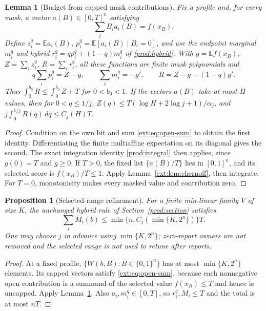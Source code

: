 \documentclass[11pt]{article}
\newtheorem{lemma}[theorem]{Lemma}
\newtheorem{proposition}[theorem]{Proposition}
\theoremstyle{definition}\newtheorem{definition}[theorem]{Definition}
\theoremstyle{remark}\newtheorem{remark}[theorem]{Remark}
\newcommand{\E}{\mathbb E}
\begin{document}
\begin{lemma}[Budget from capped mask contributions]\label{ext:lem:budget}
Fix a profile and, for every mask, a vector $a(B)\in[0,T]^n$ satisfying
\begin{equation}\label{ext:eq:open-sum}
 \sum_iB_i a_i(B)=f(x_B).
\end{equation}
Define $z_i^q=\E a_i(B)$, $p_i^q=\E[a_i(B)\mid B_i=0]$, and use the endpoint
marginal $m_i^q$ and hybrid $r_i^q=qp_i^q+(1-q)m_i^q$ of
\eqref{prod:hybrid}.  With $g=\E f(x_B)$, $Z=\sum_i z_i^q$, $R=\sum_i r_i^q$,
all these functions are finite mask polynomials and
\[
 q\sum_i p_i^q=Z-g,\qquad \sum_i m_i^q=-g',\qquad R=Z-g-(1-q)g'.
\]
Thus $\int_0^{b_0}R\le\int_0^{b_0}Z+T$ for $0<b_0<1$.
If the vectors $a(B)$ take at most $H$ values, then for $0<q\le1/j$,
$Z(q)\le T(\log H+2\log j+1)/\alpha_j$, and
$j\int_0^{1/j}R(q)\,dq\le C_j(H)T$.
\end{lemma}
\begin{proof}
Condition on the own bit and sum \eqref{ext:eq:open-sum} to obtain the first
identity.  Differentiating the finite multiaffine expectation on its diagonal
gives the second.  The exact integration identity \eqref{prod:integral}
then applies, since $g(0)=T$ and $g\ge0$.
If $T>0$, the fixed list $\{a(B)/T\}$ lies in $[0,1]^n$, and its selected
score is $f(x_B)/T\le1$.  Apply Lemma~\ref{ext:lem:chernoff}, then integrate.
For $T=0$, monotonicity makes every masked value and contribution zero.
\end{proof}

\begin{proposition}[Selected-range refinement]\label{ext:prop:range}
For a finite min-linear family $V$ of size $K$, the unchanged hybrid rule
of Section~\ref{prod:section} satisfies
\[
 \sum_iM_i(b)\le\min\{n,C_j(\min\{K,2^n\})\}T.
\]
One may choose $j$ in advance using $\min\{K,2^n\}$; zero-report owners
are not removed and the selected range is not used to retune after reports.
\end{proposition}
\begin{proof}
At a fixed profile, $\{W(b,B):B\in\{0,1\}^n\}$ has at most
$\min\{K,2^n\}$ elements.  Its capped vectors satisfy
\eqref{ext:eq:open-sum}, because each nonnegative open contribution is a
summand of the selected value $f(x_B)\le T$ and hence is uncapped.
Apply Lemma~\ref{ext:lem:budget}.  Also $a_i,m_i^q\in[0,T]$, so
$r_i^q,M_i\le T$ and the total is at most $nT$.
\end{proof}
\end{document}
